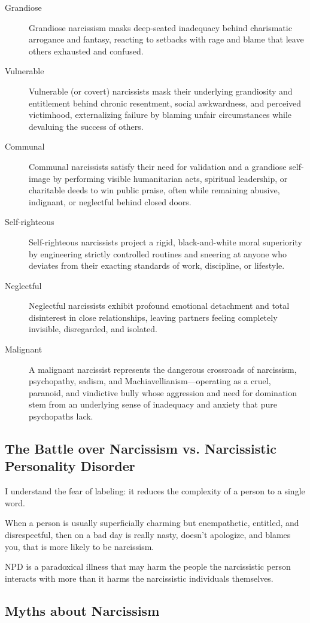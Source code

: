 \documentclass[11pt,letter]{article}
\begin{document}
\begin{description}

\item[Grandiose]
Grandiose narcissism masks deep-seated inadequacy behind charismatic arrogance
and fantasy, reacting to setbacks with rage and blame that leave others
exhausted and confused.

\item[Vulnerable]
Vulnerable (or covert) narcissists mask their underlying grandiosity and
entitlement behind chronic resentment, social awkwardness, and perceived
victimhood, externalizing failure by blaming unfair circumstances while
devaluing the success of others.

\item[Communal]
Communal narcissists satisfy their need for validation and a grandiose
self-image by performing visible humanitarian acts, spiritual leadership, or
charitable deeds to win public praise, often while remaining abusive,
indignant, or neglectful behind closed doors.

\item[Self-righteous]
Self-righteous narcissists project a rigid, black-and-white moral superiority
by engineering strictly controlled routines and sneering at anyone who deviates
from their exacting standards of work, discipline, or lifestyle.

\item[Neglectful]
Neglectful narcissists exhibit profound emotional detachment and total
disinterest in close relationships, leaving partners feeling completely
invisible, disregarded, and isolated.

\item[Malignant]
A malignant narcissist represents the dangerous crossroads of narcissism,
psychopathy, sadism, and Machiavellianism—operating as a cruel, paranoid, and
vindictive bully whose aggression and need for domination stem from an
underlying sense of inadequacy and anxiety that pure psychopaths lack.

\end{description}

\subsection{The Battle over Narcissism vs. Narcissistic Personality Disorder}

I understand the fear of labeling: it reduces the complexity of a person to a
single word.

When a person is usually superficially charming but enempathetic, entitled, and
disrespectful, then on a bad day is really nasty, doesn't apologize, and blames
you, that is more likely to be narcissism.

NPD is a paradoxical illness that may harm the people the narcissistic person
interacts with more than it harms the narcissistic individuals themselves.

\subsection{Myths about Narcissism}
\end{document}
